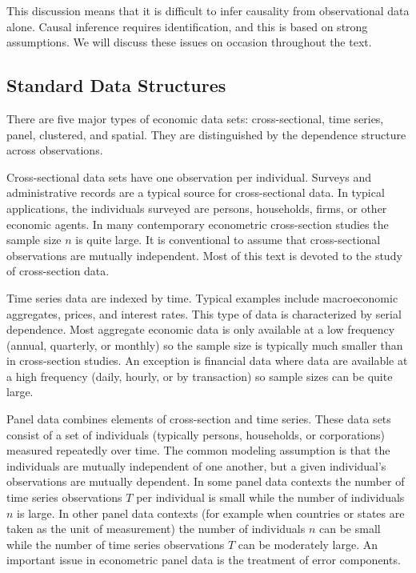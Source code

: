 \documentclass[10pt]{article}
\begin{document}
This discussion means that it is difficult to infer causality from observational data alone. Causal inference requires identification, and this is based on strong assumptions. We will discuss these issues on occasion throughout the text.

\subsection{Standard Data Structures}
There are five major types of economic data sets: cross-sectional, time series, panel, clustered, and spatial. They are distinguished by the dependence structure across observations.

Cross-sectional data sets have one observation per individual. Surveys and administrative records are a typical source for cross-sectional data. In typical applications, the individuals surveyed are persons, households, firms, or other economic agents. In many contemporary econometric cross-section studies the sample size $n$ is quite large. It is conventional to assume that cross-sectional observations are mutually independent. Most of this text is devoted to the study of cross-section data.

Time series data are indexed by time. Typical examples include macroeconomic aggregates, prices, and interest rates. This type of data is characterized by serial dependence. Most aggregate economic data is only available at a low frequency (annual, quarterly, or monthly) so the sample size is typically much smaller than in cross-section studies. An exception is financial data where data are available at a high frequency (daily, hourly, or by transaction) so sample sizes can be quite large.

Panel data combines elements of cross-section and time series. These data sets consist of a set of individuals (typically persons, households, or corporations) measured repeatedly over time. The common modeling assumption is that the individuals are mutually independent of one another, but a given individual's observations are mutually dependent. In some panel data contexts the number of time series observations $T$ per individual is small while the number of individuals $n$ is large. In other panel data contexts (for example when countries or states are taken as the unit of measurement) the number of individuals $n$ can be small while the number of time series observations $T$ can be moderately large. An important issue in econometric panel data is the treatment of error components.
\end{document}
